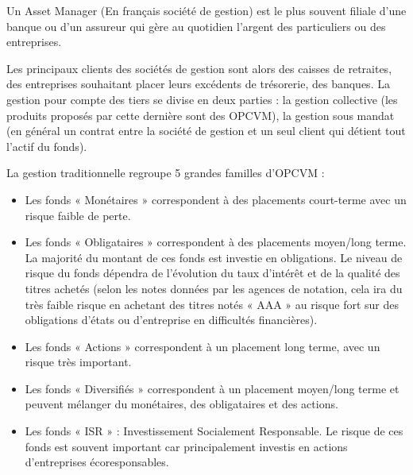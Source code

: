\par Un Asset Manager (En français société de gestion) est le plus souvent filiale d’une banque ou d’un assureur qui gère au quotidien l’argent des particuliers ou des entreprises. 
\clearpage
\par Les principaux clients des sociétés de gestion sont alors des caisses de retraites, des entreprises souhaitant placer leurs excédents de trésorerie, des banques. La gestion pour compte des tiers se divise en deux parties : la gestion collective (les produits proposés par cette dernière sont des OPCVM), la gestion sous mandat (en général un contrat entre la société de gestion et un seul client qui détient tout l’actif du fonds). 
\par La gestion traditionnelle regroupe 5 grandes familles d’OPCVM :
\begin{itemize}
    \item Les fonds « Monétaires » correspondent à des placements court-terme avec un risque faible de perte.
    \item Les fonds « Obligataires » correspondent à des placements moyen/long terme. La majorité du montant de ces fonds est investie en obligations. Le niveau de risque du fonds dépendra de l’évolution du taux d’intérêt et de la qualité des titres achetés (selon les notes données par les agences de notation, cela ira du très faible risque en achetant des titres notés « AAA » au risque fort sur des obligations d’états ou d’entreprise en difficultés financières).
    \item Les fonds « Actions » correspondent à un placement long terme, avec un risque très important.
    \item Les fonds « Diversifiés » correspondent à un placement moyen/long terme et peuvent mélanger du monétaires, des obligataires et des actions.
    \item Les fonds « ISR » : Investissement Socialement Responsable. Le risque de ces fonds est souvent important car principalement investis en actions d’entreprises écoresponsables.
\end{itemize}


